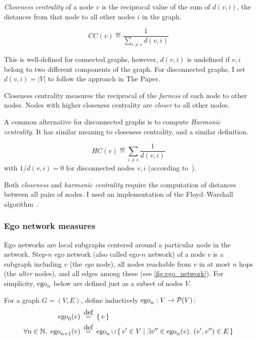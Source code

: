 \textsl{Closeness centrality} of a node $v$ is the reciprocal value of the sum of $d(v, i)$, the distances from that node to all other nodes $i$ in the graph.

\begin{definition}
    \[CC(v) \eqdef \frac{1}{\sum_{i \neq v} d(v, i)}\]
\end{definition}

This is well-defined for connected graphs, however, $d(v, i)$ is undefined if $v, i$ belong to two different components of the graph.
For disconnected graphs, I set $d(v, i) = \left\lvert V \right\rvert$ to follow the approach in The Paper.

Closeness centrality measures the reciprocal of the \textsl{farness} of each node to other nodes.
Nodes with higher closeness centrality are \textsl{closer} to all other nodes.



A common alternative for disconnected graphs is to compute \textsl{Harmonic centrality}.
It has similar meaning to closeness centrality, and a similar definition.

\begin{definition}
    \[HC(v) \eqdef \sum_{i \neq v} \frac{1}{d(v, i)}\]
    with $1 / d(v, i) = 0$ for disconnected nodes $v, i$ (according to~\cite{MarchioriHarmonySmallworld2000}).
\end{definition}

Both \textsl{closeness} and \textsl{harmonic centrality} require the computation of distances between all pairs of nodes.
I used an implementation of the Floyd–Warshall algorithm~\cite{FloydAlgorithm97Shortest1962}.

\subsubsection{Ego network measures}

Ego networks are local subgraphs centered around a particular node in the network.
Step-$n$ ego network (also called ego-$n$ network) of a node $v$ is a subgraph including $v$ (the \textsl{ego} node), all nodes reachable from $v$ in at most $n$ hops (the \textsl{alter} nodes), and all edges among these (see \autoref{fig:ego_network}).
For simplicity, $\operatorname{ego}_n$ below are defined just as a subset of nodes $V$.

\begin{definition}
    For a graph $G = (V, E)$, define inductively $\operatorname{ego}_n : V \rightarrow \mathcal{P}(V)$:
    \begin{align*}
        \ego_0(v) &\eqdef \left\{\, v \, \right\} \\
        \forall n \in \mathbb{N}.\ \ego_{n+1} (v) &\eqdef \ego_n \cup \Set{v' \in V}{ \exists v'' \in \ego_n(v).\ (v', v'') \in E }
    \end{align*}
\end{definition}

